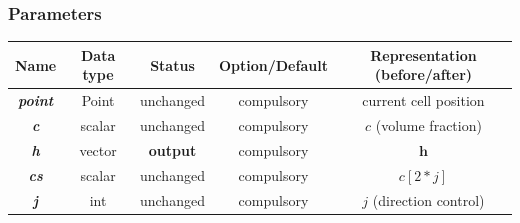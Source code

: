\documentclass[a4paper]{article}
\newcommand{\para}[1]{\textbf{\emph{\textcolor{para}{#1}}}}
\begin{document}
\subsubsection{Parameters}
\begin{center}
  \begin{tabular}{|c|c|c|c|c|}
    \hline
    Name & Data type & Status & Option/Default & Representation (before/after)\\[0.5ex]
    \hline\hline
    \para{point} & Point & unchanged & compulsory & current cell position\\
    \hline
    \para{c} & scalar & unchanged & compulsory & $ c $ (volume fraction)\\
    \hline
    \rowcolor{output}\para{h} & vector & \textbf{output} & compulsory & $\mathbf{h}$\\
    \hline
    \para{cs} & scalar & unchanged & compulsory & $c[2*j]$\\
    \hline
    \para{j} & int & unchanged & compulsory & $j$ (direction control)\\
    \hline
  \end{tabular}
\end{center}
\end{document}
